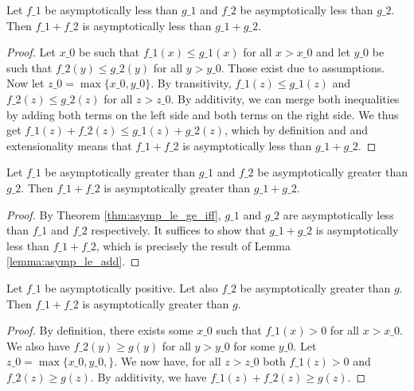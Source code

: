 \begin{lemma}
    \label{lemma:asymp_le_add}
    \leanok
    Let $f\_1$ be asymptotically less than $g\_1$ and $f\_2$ be asymptotically less
    than $g\_2$. Then $f\_1 + f\_2$ is asymptotically less than $g\_1 + g\_2$.
\end{lemma}

\begin{proof}
    \leanok
    Let $x\_0$ be such that $f\_1(x) \le g\_1(x)$ for all $x > x\_0$ and let $y\_0$ be
    such that $f\_2(y) \le g\_2(y)$ for all $y > y\_0$. Those exist due to assumptions.
    Now let $z\_0 = \max \{ x\_0, y\_0 \}$. By transitivity, $f\_1(z) \le g\_1(z)$ and 
    $f\_2(z) \le g\_2(z)$ for all $z > z\_0$. By additivity, we can merge both 
    inequalities by adding both terms on the left side and both terms on the right side.
    We thus get $f\_1(z) + f\_2(z) \le g\_1(z) + g\_2(z)$, which by definition and 
    and extensionality means that $f\_1 + f\_2$ is asymptotically less than $g\_1 + g\_2$.
\end{proof}

\begin{lemma}
    \label{lemma:asymp_ge_add}
    \leanok
    Let $f\_1$ be asymptotically greater than $g\_1$ and $f\_2$ be asymptotically greater
    than $g\_2$. Then $f\_1 + f\_2$ is asymptotically greater than $g\_1 + g\_2$.
\end{lemma}

\begin{proof}
    \leanok
    By Theorem \ref{thm:asymp_le_ge_iff}, $g\_1$ and $g\_2$ are asymptotically less 
    than $f\_1$ and $f\_2$ respectively. It suffices to show that $g\_1 + g\_2$ is
    asymptotically less than $f\_1 + f\_2$, which is precisely the result of
    Lemma \ref{lemma:asymp_le_add}.
\end{proof}

\begin{lemma}
    \label{lemma:asymp_ge_add_pos}
    \leanok
    Let $f\_1$ be asymptotically positive. Let also $f\_2$ be asymptotically greater 
    than $g$. Then $f\_1 + f\_2$ is asymptotically greater than $g$.
\end{lemma}

\begin{proof}
    \leanok
    By definition, there exists some $x\_0$ such that $f\_1(x) > 0$ for all $x > x\_0$.
    We also have $f\_2(y) \ge g(y)$ for all $y > y\_0$ for some $y\_0$. Let
    $z\_0 = \max \{ x\_0, y\_0, \}$. We now have, for all $z > z\_0$ both $f\_1(z) > 0$
    and $f\_2(z) \ge g(z)$. By additivity, we have $f\_1(z) + f\_2(z) \ge g(z)$. 
\end{proof}

